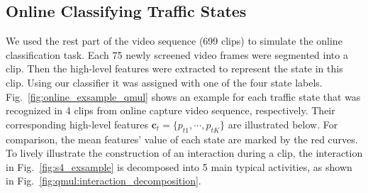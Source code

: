 \subsection{Online Classifying Traffic States}
\label{exp:qmul:online classify} 
We used the rest part of the video sequence (699 clips) to simulate the online classification task.
Each 75 newly screened video frames were segmented into a clip.
Then the high-level features were extracted to represent the state in this clip. 
Using our classifier it was assigned with one of the four state labels.
Fig.~\ref{fig:online_exsample_qmul} shows an example for each traffic state that was recognized in 4 clips from online capture video sequence, respectively. Their corresponding high-level features $\mathbf{c}_t =\{p_{t1},\cdots,p_{tK}\}$ are illustrated below. For comparison, the mean features' value of each state are marked by the red curves.
To lively illustrate the construction of an interaction during a clip, the interaction in Fig.~\ref{fig:s4_exsample} is decomposed into 5 main typical activities, as shown in Fig.~\ref{fig:qmul:interaction_decomposition}. 

